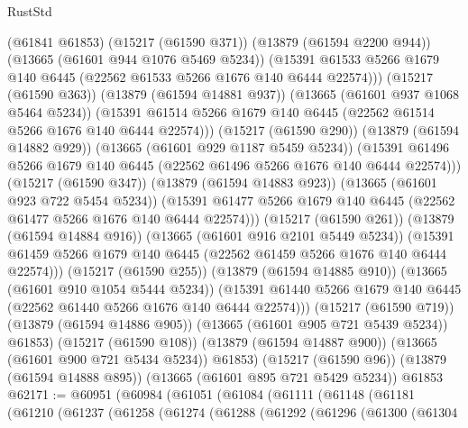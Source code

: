 \begin{lexlean}{RustStd}
\begin{coremodule}
                    (@61841 @61853)
                    (@15217 (@61590 @371))
                    (@13879 (@61594 @2200 @944))
                    (@13665 (@61601 @944 @1076 @5469 @5234))
                    (@15391
                      @61533
                      @5266
                      @1679
                      @140
                      @6445
                      (@22562 @61533 @5266 @1676 @140 @6444 @22574)))
                  (@15217 (@61590 @363))
                  (@13879 (@61594 @14881 @937))
                  (@13665 (@61601 @937 @1068 @5464 @5234))
                  (@15391
                    @61514
                    @5266
                    @1679
                    @140
                    @6445
                    (@22562 @61514 @5266 @1676 @140 @6444 @22574)))
                (@15217 (@61590 @290))
                (@13879 (@61594 @14882 @929))
                (@13665 (@61601 @929 @1187 @5459 @5234))
                (@15391
                  @61496
                  @5266
                  @1679
                  @140
                  @6445
                  (@22562 @61496 @5266 @1676 @140 @6444 @22574)))
              (@15217 (@61590 @347))
              (@13879 (@61594 @14883 @923))
              (@13665 (@61601 @923 @722 @5454 @5234))
              (@15391 @61477 @5266 @1679 @140 @6445 (@22562 @61477 @5266 @1676 @140 @6444 @22574)))
            (@15217 (@61590 @261))
            (@13879 (@61594 @14884 @916))
            (@13665 (@61601 @916 @2101 @5449 @5234))
            (@15391 @61459 @5266 @1679 @140 @6445 (@22562 @61459 @5266 @1676 @140 @6444 @22574)))
          (@15217 (@61590 @255))
          (@13879 (@61594 @14885 @910))
          (@13665 (@61601 @910 @1054 @5444 @5234))
          (@15391 @61440 @5266 @1679 @140 @6445 (@22562 @61440 @5266 @1676 @140 @6444 @22574)))
        (@15217 (@61590 @719))
        (@13879 (@61594 @14886 @905))
        (@13665 (@61601 @905 @721 @5439 @5234))
        @61853)
      (@15217 (@61590 @108))
      (@13879 (@61594 @14887 @900))
      (@13665 (@61601 @900 @721 @5434 @5234))
      @61853)
    (@15217 (@61590 @96))
    (@13879 (@61594 @14888 @895))
    (@13665 (@61601 @895 @721 @5429 @5234))
    @61853
@62171 := @60951
    (@60984
      (@61051
        (@61084
          (@61111
            (@61148
              (@61181
                (@61210
                  (@61237
                    (@61258
                      (@61274
                        (@61288
                          (@61292
                            (@61296
                              (@61300
                                (@61304

\end{coremodule}
\end{lexlean}
